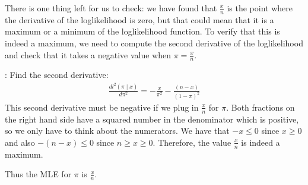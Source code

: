 \documentclass[letterpaper,10pt,english]{jupyterBook}
\begin{document}
\sphinxAtStartPar
There is one thing left for us to check: we have found that \(\frac{x}{n}\) is the point where the derivative of the log\sphinxhyphen{}likelihood is zero, but that could mean that it is a maximum or a minimum of the log\sphinxhyphen{}likelihood function. To verify that this is indeed a maximum, we need to compute the second derivative of the log\sphinxhyphen{}likelihood and check that it takes a negative value when \({\pi} =  \frac{x}{n}\).

\sphinxAtStartPar
{}: Find the second derivative:
\begin{equation*}
\begin{split}
\begin{equation}
\frac{d l^2 \left( \pi \mid x \right)}{d \pi ^2} =  -\frac{x}{\pi^2}  -\frac{(n-x)}{(1-\pi)^2}
\end{equation}
\end{split}
\end{equation*}
\sphinxAtStartPar
This second derivative must be negative if we plug in \(\frac{x}{n}\) for \({\pi}\). Both fractions on the right hand side have a squared number in the denominator which is positive, so we only have to think about the numerators. We have that \(-x \leq 0 \) since \(x \geq 0\) and also \(-(n-x) \leq 0 \) since \(n \geq x \geq 0\). Therefore, the value \(\frac{x}{n}\) is indeed a maximum.

\sphinxAtStartPar
Thus the MLE for \(\pi\) is \(\frac{x}{n}\).
\end{document}
